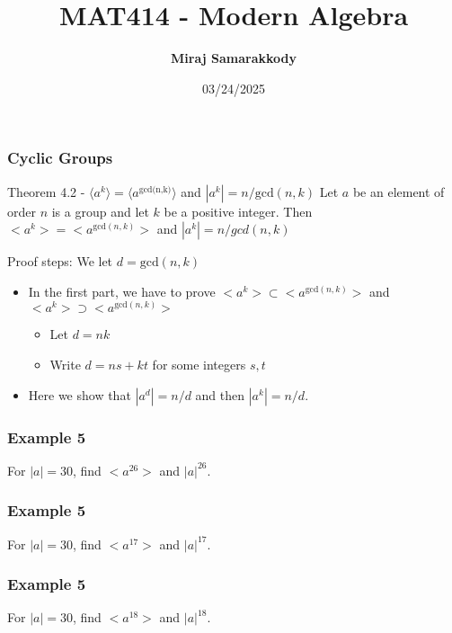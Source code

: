 \documentclass{beamer}
\title{MAT414 - Modern Algebra}
\author{\textbf{Miraj Samarakkody}}
\institute{Tougaloo College}
\date{03/24/2025}
\begin{document}
\begin{frame}
    \titlepage
\end{frame}

\begin{frame}
    \frametitle{Cyclic Groups}

    \begin{block}{Theorem 4.2 - \(\langle a^k \rangle= \langle a^{\text{gcd(n,k)}}\rangle\) and \(|a^k|=n/ \text{gcd}(n,k)\)}
        Let \(a\) be an element of order \(n\) is a group and let \(k\) be a positive integer. Then \(<a^k>=<a^{\text{gcd}(n,k)}>\) and \(|a^k|=n/gcd(n,k)\)
    \end{block}\pause 
    \begin{block}{Proof steps:}
        We let \(d=\text{gcd}(n,k)\)
        \begin{itemize}
            \item In the first part, we have to prove \(<a^k> \subset <a^{\text{gcd}(n,k)}>\) and \(<a^k>\supset <a^{\text{gcd}(n,k)}>\)\pause
            \begin{itemize}
                \item Let \(d=nk\)\pause
                \item Write \(d=ns+kt\) for some integers \(s,t \)\pause
            \end{itemize} 
            \item Here we show that \(|a^d|= n/d\) and then \(|a^k| =n/d\). 
        \end{itemize}
        
    \end{block}
\end{frame}

    \begin{frame}
        \frametitle{Example 5}
    For \(|a|=30\), find \(< a^{26} >\) and \(|a|^{26}\).
        
    
    \end{frame}

    
    \begin{frame}
        \frametitle{Example 5}
    For \(|a|=30\), find \(< a^{17} >\) and \(|a|^{17}\).
        
    
    \end{frame}

    \begin{frame}
        \frametitle{Example 5}
    For \(|a|=30\), find \(< a^{18} >\) and \(|a|^{18}\).
        
    
    \end{frame}
\end{document}

